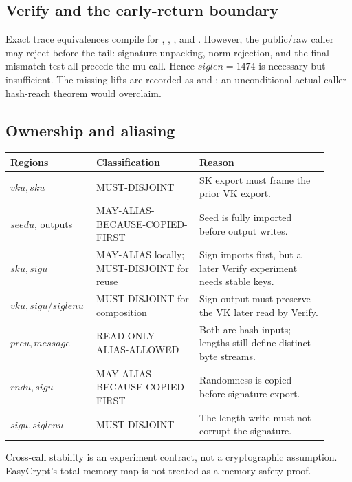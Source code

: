 \subsection{Verify and the early-return boundary}

Exact trace equivalences compile for ,
, , and
.  However, the public/raw caller
may reject before the tail: signature unpacking, norm rejection, and the final
mismatch test all precede the mu call.  Hence \(\mathit{siglen}=1474\) is
necessary but insufficient.  The missing lifts are recorded as
 and
; an
unconditional actual-caller hash-reach theorem would overclaim.

\subsection{Ownership and aliasing}

\begin{center}
\small
\begin{tabular}{p{0.22\linewidth}p{0.31\linewidth}p{0.39\linewidth}}
\toprule
Regions & Classification & Reason \\
\midrule
$vku,sku$ & MUST-DISJOINT & SK export must frame the prior VK export. \\
$seedu$, outputs & MAY-ALIAS-BECAUSE-COPIED-FIRST & Seed is fully imported before output writes. \\
$sku,sigu$ & MAY-ALIAS locally; MUST-DISJOINT for reuse & Sign imports first, but a later Verify experiment needs stable keys. \\
$vku,sigu/siglenu$ & MUST-DISJOINT for composition & Sign output must preserve the VK later read by Verify. \\
$preu,message$ & READ-ONLY-ALIAS-ALLOWED & Both are hash inputs; lengths still define distinct byte streams. \\
$rndu,sigu$ & MAY-ALIAS-BECAUSE-COPIED-FIRST & Randomness is copied before signature export. \\
$sigu,siglenu$ & MUST-DISJOINT & The length write must not corrupt the signature. \\
\bottomrule
\end{tabular}
\end{center}

Cross-call stability is an experiment contract, not a cryptographic
assumption.  EasyCrypt's total memory map is not treated as a memory-safety
proof.
